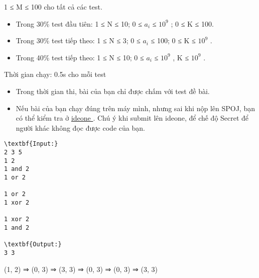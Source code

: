 1 ≤ M ≤ 100 cho tất cả các test.  
\begin{itemize}
	\item      Trong 30\% test đầu tiên: 1 ≤ N ≤ 10; 0 ≤ $a_{i}$     ≤ $10^{9}$     ; 0 ≤ K ≤ 100.    
	\item      Trong 30\% test tiếp theo: 1 ≤ N ≤ 3; 0 ≤ $a_{i}$     ≤ 100; 0 ≤ K ≤ $10^{9}$     .    
	\item      Trong 40\% test tiếp theo: 1 ≤ N ≤ 10; 0 ≤ $a_{i}$      ≤ $10^{9}$     , K ≤ $10^{9}$     .    
\end{itemize}

   Thời gian chạy: 0.5s cho mỗi test
\begin{itemize}
	\item     Trong thời gian thi, bài của bạn chỉ được chấm với test đề bài.   
	\item     Nếu bài của bạn chạy đúng trên máy mình, nhưng sai khi nộp lên SPOJ, bạn có thể kiểm tra ở    \href{https://ideone.com}{     ideone    }    . Chú ý khi submit lên ideone, để chế độ Secret để người khác không đọc được code của bạn.   
\end{itemize}
\begin{verbatim}
\textbf{Input:}
2 3 5
1 2
1 and 2
1 or 2

1 or 2
1 xor 2

1 xor 2
1 and 2 

\textbf{Output:}
3 3
\end{verbatim}
(1, 2) ⇒ (0, 3) ⇒ (3, 3) ⇒ (0, 3) ⇒ (0, 3) ⇒ (3, 3)